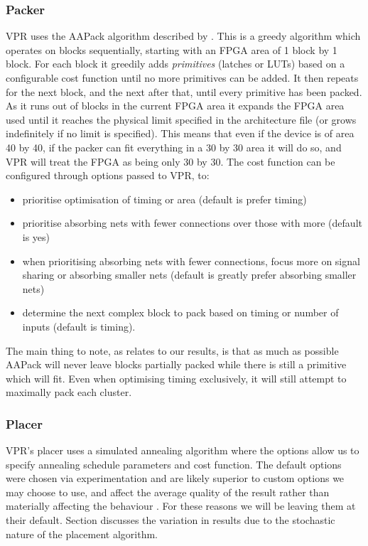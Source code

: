 \documentclass[12pt,final,oneside]{dwThesis} %
\begin{document}
   \subsubsection{Packer}
   \gls{VPR} uses the AAPack algorithm described by \cite{AAPackThesis}. This is a greedy algorithm which operates on blocks sequentially, starting with an \gls{FPGA} area of 1 block by 1 block. For each block it greedily adds \textit{primitives} (latches or \glspl{LUT}) based on a configurable cost function until no more primitives can be added. It then repeats for the next block, and the next after that, until every primitive has been packed. As it runs out of blocks in the current \gls{FPGA} area it expands the \gls{FPGA} area used until it reaches the physical limit specified in the architecture file (or grows indefinitely if no limit is specified). This means that even if the device is of area 40 by 40, if the packer can fit everything in a 30 by 30 area it will do so, and \gls{VPR} will treat the \gls{FPGA} as being only 30 by 30.
   The cost function can be configured through options passed to \gls{VPR}, to\cite{VPRManual}:
   \begin{itemize}
      \item prioritise optimisation of timing or area (default is prefer timing)
      \item prioritise absorbing nets with fewer connections over those with more (default is yes)
      \item when prioritising absorbing nets with fewer connections, focus more on signal sharing or absorbing smaller nets (default is greatly prefer absorbing smaller nets)
      \item determine the next complex block to pack based on timing or number of inputs (default is timing).
   \end{itemize}
   The main thing to note, as relates to our results, is that as much as possible AAPack will never leave blocks partially packed while there is still a primitive which will fit. Even when optimising timing exclusively, it will still attempt to maximally pack each cluster.

   \subsubsection{Placer}
   \gls{VPR}'s placer uses a simulated annealing algorithm where the options allow us to specify annealing schedule parameters and cost function. The default options were chosen via experimentation and are likely superior to custom options we may choose to use, and affect the average quality of the result rather than materially affecting the behaviour \cite{VPRManual, VPRBook}. For these reasons we will be leaving them at their default.
   Section  discusses the variation in results due to the stochastic nature of the placement algorithm.
\end{document}

